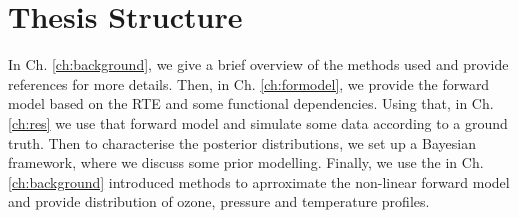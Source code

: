 \section{Thesis Structure}
In Ch. \ref{ch:background}, we give a brief overview of the methods used and provide references for more details.
Then, in Ch. \ref{ch:formodel}, we provide the forward model based on the RTE and some functional dependencies.
Using that, in Ch. \ref{ch:res} we use that forward model and simulate some data according to a ground truth.
Then to characterise the posterior distributions, we set up a Bayesian framework, where we discuss some prior modelling.
Finally, we use the in Ch. \ref{ch:background} introduced methods to aprroximate the non-linear forward model and provide distribution of ozone, pressure and temperature profiles.
